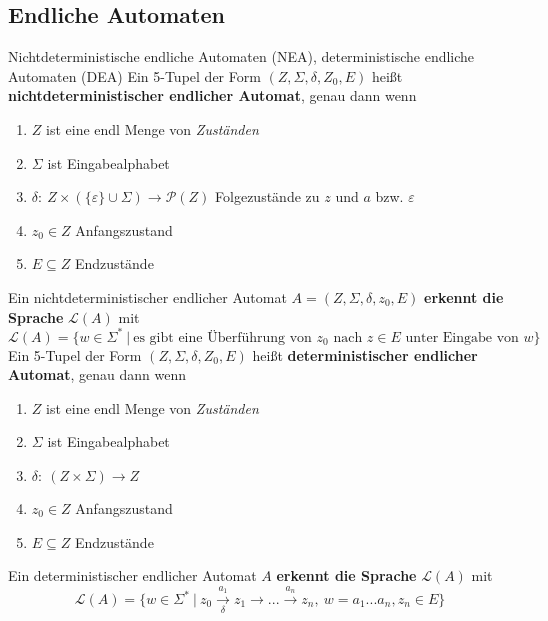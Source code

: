 \subsection{Endliche Automaten}
Nichtdeterministische endliche Automaten (NEA), deterministische endliche Automaten (DEA)
\Defi Ein 5-Tupel der Form $(Z, \Sigma, \delta, Z_0, E)$ heißt \textbf{nichtdeterministischer endlicher Automat}, genau dann wenn
\begin{enumerate}
 \item $Z$ ist eine endl Menge von \emph{Zuständen}
 \item $\Sigma$ ist Eingabealphabet
 \item $\delta{:}\ Z \times (\{\varepsilon\} \cup \Sigma) \to \mathcal{P}(Z)$ Folgezustände zu $z$ und $a$ bzw. $\varepsilon$
 \item $z_0 \in Z$ Anfangszustand
 \item $E \subseteq Z$ Endzustände
\end{enumerate}
\Defi Ein nichtdeterministischer endlicher Automat $A = (Z, \Sigma, \delta, z_0, E)$ \textbf{erkennt die Sprache} $\mathcal{L}(A)$ mit 
     \[\mathcal{L}(A) = \{w  \in \Sigma^*\ |\ \text{es gibt eine Überführung von $z_0$ nach $z \in E$ unter Eingabe von $w$}\}\]
\Defi Ein 5-Tupel der Form $(Z, \Sigma, \delta, Z_0, E)$ heißt \textbf{deterministischer endlicher Automat}, genau dann wenn
\begin{enumerate}
 \item $Z$ ist eine endl Menge von \emph{Zuständen}
 \item $\Sigma$ ist Eingabealphabet
 \item {\color{red} $\delta{:}\ (Z \times \Sigma) \to Z$}
 \item $z_0 \in Z$ Anfangszustand
 \item $E \subseteq Z$ Endzustände
\end{enumerate}
\Defi Ein deterministischer endlicher Automat $A$ \textbf{erkennt die Sprache} $\mathcal{L}(A)$ mit
    \[\mathcal{L}(A) = \{w  \in \Sigma^*\ |\ z_0 \xrightarrow[\delta]{a_1} z_1 \to ... \xrightarrow{a_n} z_n,\ w = a_1...a_n, z_n \in E\}\]
